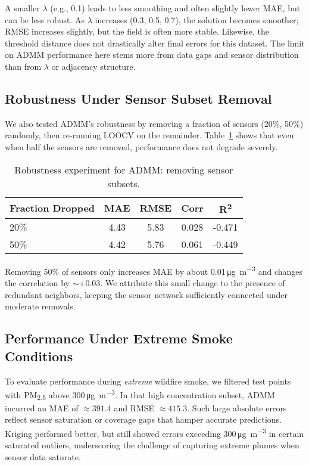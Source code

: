\documentclass[12pt]{article}                                %
\begin{document}
A smaller $\lambda$ (e.g., 0.1) leads to less smoothing and often slightly lower MAE, but can 
be less robust. As $\lambda$ increases (0.3, 0.5, 0.7), the solution becomes smoother; RMSE 
increases slightly, but the field is often more stable. Likewise, the threshold distance 
does not drastically alter final errors for this dataset. The limit on ADMM performance here 
stems more from data gaps and sensor distribution than from $\lambda$ or adjacency structure.

\subsection{Robustness Under Sensor Subset Removal}
\label{sec:robustness}    %

We also tested ADMM’s robustness by removing a fraction of sensors (20\%, 50\%) randomly, 
then re-running LOOCV on the remainder. Table~\ref{tab:robustnessResults} shows that even 
when half the sensors are removed, performance does not degrade severely.

\begin{table}[!ht]
\centering
\caption{Robustness experiment for ADMM: removing sensor subsets.}
\label{tab:robustnessResults}
\begin{tabular}{lcccc}
\toprule
Fraction Dropped & MAE & RMSE & Corr & R\textsuperscript{2} \\
\midrule
20\% & 4.43 & 5.83 & 0.028 & -0.471 \\
50\% & 4.42 & 5.76 & 0.061 & -0.449 \\
\bottomrule
\end{tabular}
\end{table}

Removing 50\% of sensors only increases MAE by about 0.01\,\si{\micro\gram\per\cubic\meter} 
and changes the correlation by $\sim +0.03$. We attribute this small change to the presence 
of redundant neighbors, keeping the sensor network sufficiently connected under moderate 
removals.

\subsection{Performance Under Extreme Smoke Conditions}
\label{sec:extremeSmoke}    %

To evaluate performance during \textit{extreme} wildfire smoke, we filtered test points 
with PM\textsubscript{2.5} above 300\,\si{\micro\gram\per\cubic\meter}. In that high 
concentration subset, ADMM incurred an MAE of $\approx391.4$ and RMSE $\approx415.3$. Such 
large absolute errors reflect sensor saturation or coverage gaps that hamper accurate 
predictions. Kriging performed better, but still showed errors exceeding 
300\,\si{\micro\gram\per\cubic\meter} in certain saturated outliers, underscoring the 
challenge of capturing extreme plumes when sensor data saturate.
\end{document}
